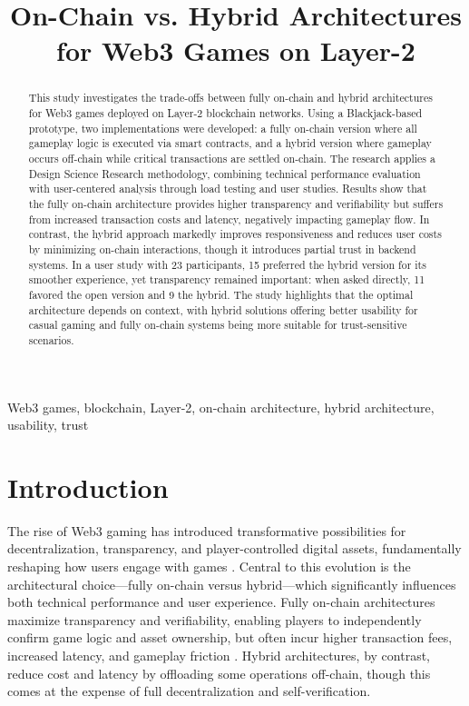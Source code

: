 \documentclass[10pt,conference]{IEEEtran}
\begin{document}
\title{On-Chain vs. Hybrid Architectures for Web3 Games on Layer-2}

\author{}

\maketitle

\begin{abstract}
This study investigates the trade-offs between fully on-chain and hybrid architectures for Web3 games deployed on Layer-2 blockchain networks. Using a Blackjack-based prototype, two implementations were developed: a fully on-chain version where all gameplay logic is executed via smart contracts, and a hybrid version where gameplay occurs off-chain while critical transactions are settled on-chain. The research applies a Design Science Research methodology, combining technical performance evaluation with user-centered analysis through load testing and user studies. Results show that the fully on-chain architecture provides higher transparency and verifiability but suffers from increased transaction costs and latency, negatively impacting gameplay flow. In contrast, the hybrid approach markedly improves responsiveness and reduces user costs by minimizing on-chain interactions, though it introduces partial trust in backend systems. In a user study with 23 participants, 15 preferred the hybrid version for its smoother experience, yet transparency remained important: when asked directly, 11 favored the open version and 9 the hybrid. The study highlights that the optimal architecture depends on context, with hybrid solutions offering better usability for casual gaming and fully on-chain systems being more suitable for trust-sensitive scenarios.
\end{abstract}

\begin{IEEEkeywords}
Web3 games, blockchain, Layer-2, on-chain architecture, hybrid architecture, usability, trust
\end{IEEEkeywords}

\section{Introduction} \label{sec:intro}

The rise of Web3 gaming has introduced transformative possibilities for decentralization, transparency, and player-controlled digital assets, fundamentally reshaping how users engage with games \cite{Min2019}. Central to this evolution is the architectural choice—fully on-chain versus hybrid—which significantly influences both technical performance and user experience. Fully on-chain architectures maximize transparency and verifiability, enabling players to independently confirm game logic and asset ownership, but often incur higher transaction fees, increased latency, and gameplay friction \cite{Min2019}. Hybrid architectures, by contrast, reduce cost and latency by offloading some operations off-chain, though this comes at the expense of full decentralization and self-verification.
\end{document}
